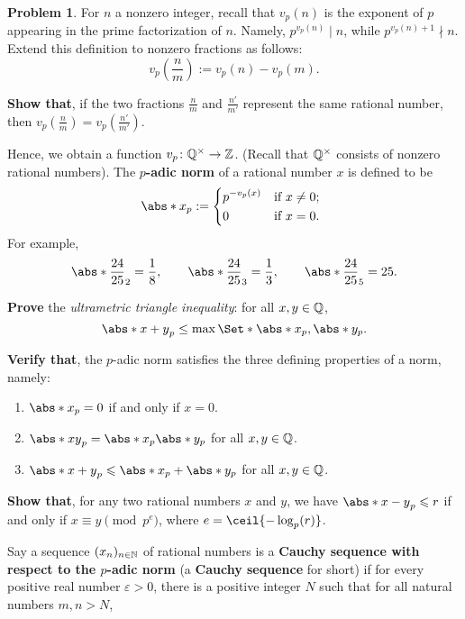 \documentclass[11pt]{article}
\theoremstyle{plain}
\theoremstyle{definition}
\newtheorem{problem}{Problem}
\theoremstyle{remark}
\numberwithin{equation}{problem}
\begin{document}
\begin{problem}\label{Problem 15.3}
  For $n$ a nonzero integer, recall that $v_p(n)$ is the exponent of $p$ appearing in the prime factorization of $n$. Namely, $p^{v_p(n)}\mid n$, while $p^{v_p(n)+1}\nmid n$. Extend this definition to nonzero fractions as follows:
	\[
		v_p(\frac{n}{m}) := v_p(n) - v_p(m).
	\]
  \begin{listinprob}
		\item \textbf{Show that}, if the two fractions $\frac{n}{m}$ and $\frac{n'}{m'}$ represent the same rational number, then $v_p(\frac{n}{m})=v_p(\frac{n'}{m'})$.
  \end{listinprob}
	Hence, we obtain a function $v_p\colon\mathbb{Q}^{\times}\to\mathbb{Z}$. (Recall that $\mathbb{Q}^{\times}$ consists of nonzero rational numbers). The \textbf{$p$-adic norm} of a rational number $x$ is defined to be
	\[
		\abs*{x}_p:=
		\begin{dcases*}
			p^{-v_p(x)} & if $x\neq 0$;\\
			0 & if $x=0$.
		\end{dcases*}
	\]
	For example,
	\[
		\abs*{\frac{24}{25}}_{2} = \frac{1}{8},\qquad 
		\abs*{\frac{24}{25}}_{3} = \frac{1}{3},\qquad 
		\abs*{\frac{24}{25}}_{5} = 25.
	\]  
  \begin{listinprob}[resume]
		\item \textbf{Prove} the \emph{ultrametric triangle inequality}: for all $x,y\in\mathbb{Q}$,
		\[
			\abs*{x+y}_p \leq \max\Set*{\abs*{x}_p,\abs*{y}_p}.
		\]
		\item \textbf{Verify that}, the $p$-adic norm satisfies the three defining properties of a norm, namely:
		\begin{enumerate}%
			\item $\abs*{x}_{p}=0$ if and only if $x=0$.
			\item $\abs*{xy}_{p}=\abs*{x}_{p}\abs*{y}_{p}$ for all $x,y\in\mathbb{Q}$.
			\item $\abs*{x+y}_{p}\le\abs*{x}_{p}+\abs*{y}_{p}$ for all $x,y\in\mathbb{Q}$.
		\end{enumerate}
		\item \label{p1.p-adic_to_congruence} \textbf{Show that}, for any two rational numbers $x$ and $y$, we have $\abs*{x-y}_{p}\le r$ if and only if $x\equiv y\pmod{p^e}$, where $e=\ceil{-\log_p(r)}$.
  \end{listinprob}
	Say a sequence $(x_n)_{n\in\mathbb{N}}$ of rational numbers is a \textbf{Cauchy sequence with respect to the $p$-adic norm} (a \textbf{Cauchy sequence} for short) if for every positive real number $\varepsilon>0$, there is a positive integer $N$ such that for all natural numbers $m,n>N$,  

\end{problem}
\end{document}
